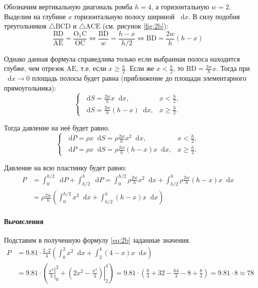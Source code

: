 \documentclass[a4paper,12pt]{article}
\newcommand*\diff{\mathop{}\!\mathrm{d}}
\begin{document}
Обозначим вертикальную диагональ ромба \(h = 4\), а горизонтальную \(w = 2\).
Выделим на глубине \(x\) горизонтальную полосу шириной \(\diff x\).
В силу подобия треугольников
\(\triangle \mathrm{BCD}\) и \(\triangle \mathrm{ACE}\)
(см. рисунок \ref{fig:2b}):
\[
  \frac{\mathrm{BD}}{\mathrm{AE}} = \frac{\mathrm{O_1 C}}{\mathrm{OC}}
  \Leftrightarrow
  \frac{\mathrm{BD}}{w} = \frac{h - x}{h / 2}
  \Leftrightarrow
  \mathrm{BD} = \frac{2w}{h} (h - x)
\]

Однако данная формула справедлива только
если выбранная полоса находится глубже, чем отрезок \(\mathrm{AE}\),
т.е. если \(x \ge \frac{h}{2}\).
Если же \(x < \frac{h}{2}\), то \(\mathrm{BD} = \frac{2w}{h} x\).
Тогда при \(\diff x \to 0\) площадь полосы будет равна
(приближение до площади элементарного прямоугольника):
\begin{equation}
  \begin{cases}
    \diff S = \frac{2w}{h} x \diff x, & x < \frac{h}{2}, \\
    \diff S = \frac{2w}{h} (h - x) \diff x, & x \ge \frac{h}{2}.
  \end{cases}
\end{equation}

Тогда давление на неё будет равно:
\begin{equation}
  \begin{cases}
    \diff P = \rho x \diff S
      = \rho \frac{2w}{h} x^2 \diff x, & x < \frac{h}{2}, \\
    \diff P = \rho x \diff S
      = \rho \frac{2w}{h} (h - x) x \diff x, & x \ge \frac{h}{2}.
  \end{cases}
\end{equation}

Давление на всю пластинку будет равно:
\begin{equation}\label{eq:2b}
\begin{split}
  P &= \int_{0}^{h/2} \diff P + \int_{h/2}^{h} \diff P
    = \int_{0}^{h/2} \rho \frac{2w}{h} x^2 \diff x
     + \int_{h/2}^{h} \rho \frac{2w}{h} (h - x) x \diff x \\
    &= \rho \frac{2w}{h}
     \left(\int_{0}^{h/2} x^2 \diff x + \int_{h/2}^{h} (h - x) x \diff x\right)
\end{split}
\end{equation}

\paragraph{Вычисления}
Подставим в полученную формулу \ref{eq:2b} заданные значения.
\begin{align*}
  P &= 9.81 \cdot \frac{2 \cdot 2}{4}
    \left(\int_{0}^{2} x^2 \diff x + \int_{2}^{4} (4 - x) x \diff x\right) \\
    &= 9.81 \cdot \left(
      \left.\frac{x^3}{3}\right\rvert_{0}^{2}
      + \left.\left(2 x^2 - \frac{x^3}{3}\right)\right\rvert_{2}^{4}
    \right)
    = 9.81 \cdot
      \left(\frac{8}{3} + 32 - \frac{64}{3} - 8 + \frac{8}{3} \right)
    = 9.81 \cdot 8 \approx 78
\end{align*}
\end{document}
